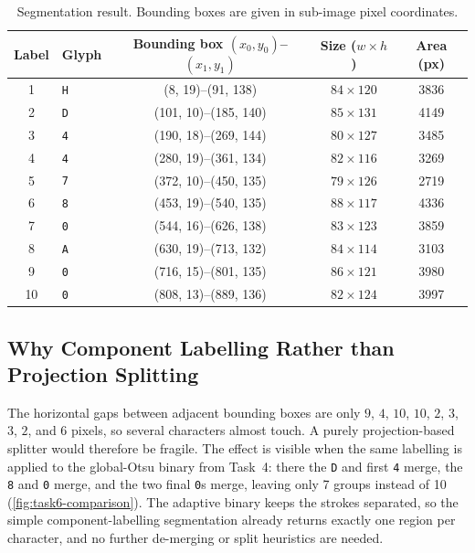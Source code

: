 \begin{table}[!htbp]
  \centering
  \caption{Segmentation result.  Bounding boxes are given in sub-image pixel
  coordinates.}
  \label{tab:task6-components}
  \begin{tabular}{clccc}
    \toprule
    Label & Glyph & Bounding box $(x_{0},y_{0})$--$(x_{1},y_{1})$ &
    Size ($w\times h$) & Area (px) \\
    \midrule
    1 & \texttt{H} & (8, 19)--(91, 138) & $84\times120$ & 3836 \\
    2 & \texttt{D} & (101, 10)--(185, 140) & $85\times131$ & 4149 \\
    3 & \texttt{4} & (190, 18)--(269, 144) & $80\times127$ & 3485 \\
    4 & \texttt{4} & (280, 19)--(361, 134) & $82\times116$ & 3269 \\
    5 & \texttt{7} & (372, 10)--(450, 135) & $79\times126$ & 2719 \\
    6 & \texttt{8} & (453, 19)--(540, 135) & $88\times117$ & 4336 \\
    7 & \texttt{0} & (544, 16)--(626, 138) & $83\times123$ & 3859 \\
    8 & \texttt{A} & (630, 19)--(713, 132) & $84\times114$ & 3103 \\
    9 & \texttt{0} & (716, 15)--(801, 135) & $86\times121$ & 3980 \\
    10 & \texttt{0} & (808, 13)--(889, 136) & $82\times124$ & 3997 \\
    \bottomrule
  \end{tabular}
\end{table}

\subsection{Why Component Labelling Rather than Projection Splitting}

The horizontal gaps between adjacent bounding boxes are only
$9$, $4$, $10$, $10$, $2$, $3$, $3$, $2$, and $6$ pixels, so several
characters almost touch.  A purely projection-based splitter would therefore
be fragile.  The effect is visible when the same labelling is applied to the
global-Otsu binary from Task~4: there the \texttt{D} and first \texttt{4}
merge, the \texttt{8} and \texttt{0} merge, and the two final \texttt{0}s
merge, leaving only 7 groups instead of 10
(\cref{fig:task6-comparison}).  The adaptive binary keeps the strokes
separated, so the simple component-labelling segmentation already returns
exactly one region per character, and no further de-merging or split heuristics
are needed.

